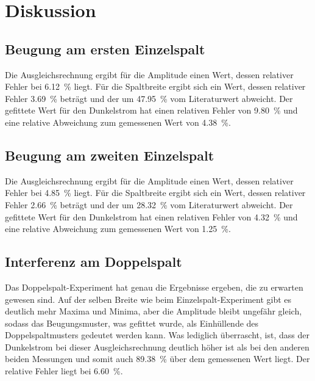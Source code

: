 \section{Diskussion}
\label{sec:Diskussion}


\subsection{Beugung am ersten Einzelspalt}
Die Ausgleichsrechnung ergibt für die Amplitude einen Wert, dessen relativer Fehler bei \SI{6.12}{\percent} liegt. Für die Spaltbreite ergibt sich ein Wert, dessen relativer Fehler \SI{3.69}{\percent} beträgt und der um \SI{47.95}{\percent} vom Literaturwert abweicht.
Der gefittete Wert für den Dunkelstrom hat einen relativen Fehler von \SI{9.80}{\percent} und eine relative Abweichung zum gemessenen Wert von \SI{4.38}{\percent}.


\subsection{Beugung am zweiten Einzelspalt}
Die Ausgleichsrechnung ergibt für die Amplitude einen Wert, dessen relativer Fehler bei \SI{4.85}{\percent} liegt. Für die Spaltbreite ergibt sich ein Wert, dessen relativer Fehler \SI{2.66}{\percent} beträgt und der um \SI{28.32}{\percent} vom Literaturwert abweicht.
Der gefittete Wert für den Dunkelstrom hat einen relativen Fehler von \SI{4.32}{\percent} und eine relative Abweichung zum gemessenen Wert von \SI{1.25}{\percent}.

\subsection{Interferenz am Doppelspalt}
Das Doppelspalt-Experiment hat genau die Ergebnisse ergeben, die zu erwarten gewesen sind. Auf der selben Breite  wie beim Einzelspalt-Experiment gibt es deutlich mehr Maxima und Minima, aber die Amplitude bleibt ungefähr gleich, sodass das Beugungsmuster, was gefittet wurde, als Einhüllende des Doppelspaltmusters gedeutet werden kann. Was lediglich überrascht, ist, dass der Dunkelstrom bei dieser Ausgleichsrechnung deutlich höher ist als bei den anderen beiden Messungen und somit auch \SI{89.38}{\percent} über dem gemessenen Wert liegt. Der relative Fehler liegt bei \SI{6.60}{\percent}.

